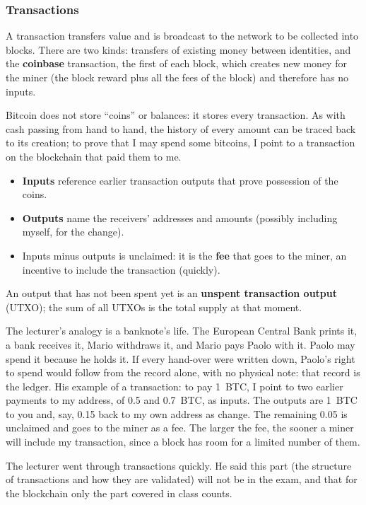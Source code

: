 \subsubsection{Transactions}

A transaction transfers value and is broadcast to the network to be collected into blocks. There are two kinds: transfers of existing money between identities, and the \textbf{coinbase} transaction, the first of each block, which creates new money for the miner (the block reward plus all the fees of the block) and therefore has no inputs.

Bitcoin does not store \enquote{coins} or balances: it stores every transaction. As with cash passing from hand to hand, the history of every amount can be traced back to its creation; to prove that I may spend some bitcoins, I point to a transaction on the blockchain that paid them to me.
\begin{itemize}
    \item \textbf{Inputs} reference earlier transaction outputs that prove possession of the coins.
    \item \textbf{Outputs} name the receivers' addresses and amounts (possibly including myself, for the change).
    \item Inputs minus outputs is unclaimed: it is the \textbf{fee} that goes to the miner, an incentive to include the transaction (quickly).
\end{itemize}
An output that has not been spent yet is an \textbf{unspent transaction output} (UTXO); the sum of all UTXOs is the total supply at that moment.

The lecturer's analogy is a banknote's life. The European Central Bank prints it, a bank receives it, Mario withdraws it, and Mario pays Paolo with it. Paolo may spend it because he holds it. If every hand-over were written down, Paolo's right to spend would follow from the record alone, with no physical note: that record is the ledger. His example of a transaction: to pay 1~BTC, I point to two earlier payments to my address, of 0.5 and 0.7~BTC, as inputs. The outputs are 1~BTC to you and, say, 0.15 back to my own address as change. The remaining 0.05 is unclaimed and goes to the miner as a fee. The larger the fee, the sooner a miner will include my transaction, since a block has room for a limited number of them.

\begin{remark}
The lecturer went through transactions quickly. He said this part (the structure of transactions and how they are validated) will not be in the exam, and that for the blockchain only the part covered in class counts.
\end{remark}


